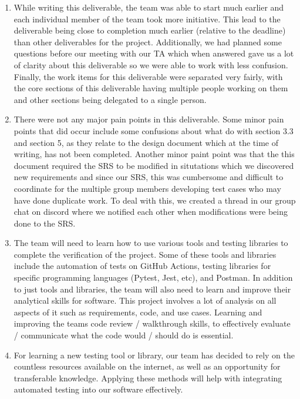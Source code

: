 \documentclass[12pt, titlepage]{article}
\begin{document}
\begin{enumerate}
  \item While writing this deliverable, the team was able to start much earlier and each individual member of the team took more initiative. This lead to the deliverable being close to completion much earlier (relative to the deadline) than other deliverables for the project. Additionally, we had planned some questions before our meeting with our TA which when answered gave us a lot of clarity about this deliverable so we were able to  work with less confusion. Finally, the work items for this deliverable were separated very fairly, with the core sections of this deliverable having multiple people working on them and other sections being delegated to a single person.
  \item There were not any major pain points in this deliverable. Some minor pain points that did occur include some confusions about what do with section 3.3 and section 5, as they relate to the design document which at the time of writing, has not been completed. Another minor paint point was that the this document required the SRS to be modified in situtations which we discovered new requirements and since our SRS, this was cumbersome and difficult to coordinate for the multiple group members developing test cases who may have done duplicate work. To deal with this, we created a thread in our group chat on discord where we notified each other when modifications were being done to the SRS.
  \item The team will need to learn how to use various tools and testing libraries to complete the verification of the project. Some of these tools and libraries include the automation of tests on GitHub Actions, testing libraries for specific programming languages (Pytest, Jest, etc), and Postman. In addition to just tools and libraries, the team will also need to learn and improve their analytical skills for software. This project involves a lot of analysis on all aspects of it such as requirements, code, and use cases. Learning and improving the teams code review / walkthrough skills, to effectively evaluate / communicate what the code would / should do is essential.
  \item For learning a new testing tool or library, our team has decided to rely on the countless resources available on the internet, as well as an opportunity for transferable knowledge. Applying these methods will help with integrating automated testing into our software effectively.\\

\end{enumerate}
\end{document}
